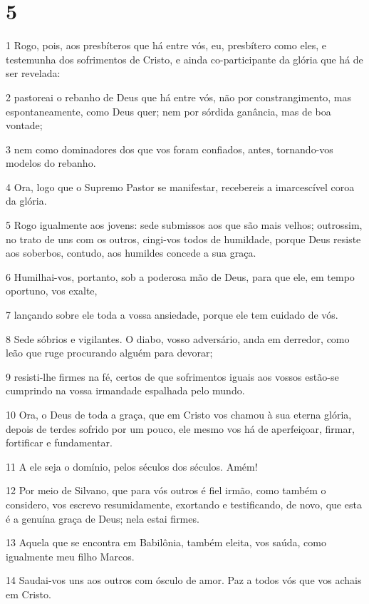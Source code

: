 \chapter{5}

\par 1 Rogo, pois, aos presbíteros que há entre vós, eu, presbítero como eles, e testemunha dos sofrimentos de Cristo, e ainda co-participante da glória que há de ser revelada:
\par 2 pastoreai o rebanho de Deus que há entre vós, não por constrangimento, mas espontaneamente, como Deus quer; nem por sórdida ganância, mas de boa vontade;
\par 3 nem como dominadores dos que vos foram confiados, antes, tornando-vos modelos do rebanho.
\par 4 Ora, logo que o Supremo Pastor se manifestar, recebereis a imarcescível coroa da glória.
\par 5 Rogo igualmente aos jovens: sede submissos aos que são mais velhos; outrossim, no trato de uns com os outros, cingi-vos todos de humildade, porque Deus resiste aos soberbos, contudo, aos humildes concede a sua graça.
\par 6 Humilhai-vos, portanto, sob a poderosa mão de Deus, para que ele, em tempo oportuno, vos exalte,
\par 7 lançando sobre ele toda a vossa ansiedade, porque ele tem cuidado de vós.
\par 8 Sede sóbrios e vigilantes. O diabo, vosso adversário, anda em derredor, como leão que ruge procurando alguém para devorar;
\par 9 resisti-lhe firmes na fé, certos de que sofrimentos iguais aos vossos estão-se cumprindo na vossa irmandade espalhada pelo mundo.
\par 10 Ora, o Deus de toda a graça, que em Cristo vos chamou à sua eterna glória, depois de terdes sofrido por um pouco, ele mesmo vos há de aperfeiçoar, firmar, fortificar e fundamentar.
\par 11 A ele seja o domínio, pelos séculos dos séculos. Amém!
\par 12 Por meio de Silvano, que para vós outros é fiel irmão, como também o considero, vos escrevo resumidamente, exortando e testificando, de novo, que esta é a genuína graça de Deus; nela estai firmes.
\par 13 Aquela que se encontra em Babilônia, também eleita, vos saúda, como igualmente meu filho Marcos.
\par 14 Saudai-vos uns aos outros com ósculo de amor. Paz a todos vós que vos achais em Cristo.


